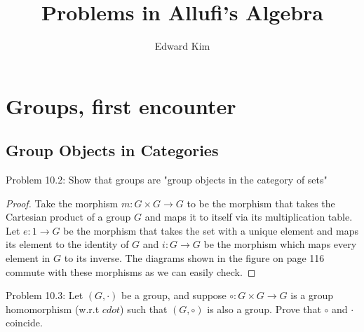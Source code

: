 \documentclass[12pt]{article}
\title{Problems in Allufi's Algebra}
\author{Edward Kim}
\begin{document}
\maketitle
\hrulefill

\section{Groups, first encounter}

\subsection*{Group Objects in Categories}

Problem 10.2: Show that groups are "group objects in the category of sets"
	
\begin{proof}
	Take the morphism $m: G \times G \rightarrow G$ to be the morphism that takes the Cartesian product of a group $G$ and maps it to itself via its multiplication table. Let $e: 1 \rightarrow G$ be the morphism that takes the set with a unique element and maps its element to the identity of $G$ and $i: G \rightarrow G$ be the morphism which maps every element in $G$ to its inverse. The diagrams shown in the figure on page 116 commute with these morphisms as we can easily check.  
\end{proof} 

Problem 10.3: Let $(G,\cdot)$ be a group, and suppose $\circ: G \times G \rightarrow G$ is a group homomorphism (w.r.t $cdot$) such that $(G, \circ)$ is also a group. Prove that $\circ$ and $\cdot$ coincide.
\end{document}
